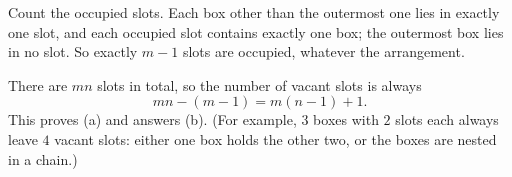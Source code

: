 Count the occupied slots. Each box other than the outermost one lies in exactly one slot, and each occupied slot contains exactly one box; the outermost box lies in no slot. So exactly $m-1$ slots are occupied, whatever the arrangement.

There are $mn$ slots in total, so the number of vacant slots is always
\[mn-(m-1)=\boxed{m(n-1)+1}.\]
This proves (a) and answers (b). (For example, $3$ boxes with $2$ slots each always leave $4$ vacant slots: either one box holds the other two, or the boxes are nested in a chain.)
